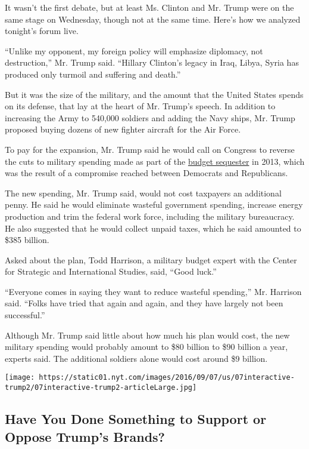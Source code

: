 It wasn't the first debate, but at least Ms. Clinton and Mr. Trump were
on the same stage on Wednesday, though not at the same time. Here's how
we analyzed tonight's forum live.

``Unlike my opponent, my foreign policy will emphasize diplomacy, not
destruction,'' Mr. Trump said. ``Hillary Clinton's legacy in Iraq,
Libya, Syria has produced only turmoil and suffering and death.''

But it was the size of the military, and the amount that the United
States spends on its defense, that lay at the heart of Mr. Trump's
speech. In addition to increasing the Army to 540,000 soldiers and
adding the Navy ships, Mr. Trump proposed buying dozens of new fighter
aircraft for the Air Force.

To pay for the expansion, Mr. Trump said he would call on Congress to
reverse the cuts to military spending made as part of the
\href{http://www.nytimes.com/2013/02/22/us/politics/questions-and-answers-about-the-sequester.html}{budget
sequester} in 2013, which was the result of a compromise reached between
Democrats and Republicans.

The new spending, Mr. Trump said, would not cost taxpayers an additional
penny. He said he would eliminate wasteful government spending, increase
energy production and trim the federal work force, including the
military bureaucracy. He also suggested that he would collect unpaid
taxes, which he said amounted to \$385 billion.

Asked about the plan, Todd Harrison, a military budget expert with the
Center for Strategic and International Studies, said, ``Good luck.''

``Everyone comes in saying they want to reduce wasteful spending,'' Mr.
Harrison said. ``Folks have tried that again and again, and they have
largely not been successful.''

Although Mr. Trump said little about how much his plan would cost, the
new military spending would probably amount to \$80 billion to \$90
billion a year, experts said. The additional soldiers alone would cost
around \$9 billion.

\href{https://www.nytimes.com/interactive/2016/09/07/us/politics/trump-products-reaction.html}{}

\texttt{[image: https://static01.nyt.com/images/2016/09/07/us/07interactive-trump2/07interactive-trump2-articleLarge.jpg]}

\hypertarget{have-you-done-something-to-support-or-oppose-trumps-brands}{%
\subsection{Have You Done Something to Support or Oppose Trump's
Brands?}\label{have-you-done-something-to-support-or-oppose-trumps-brands}}

